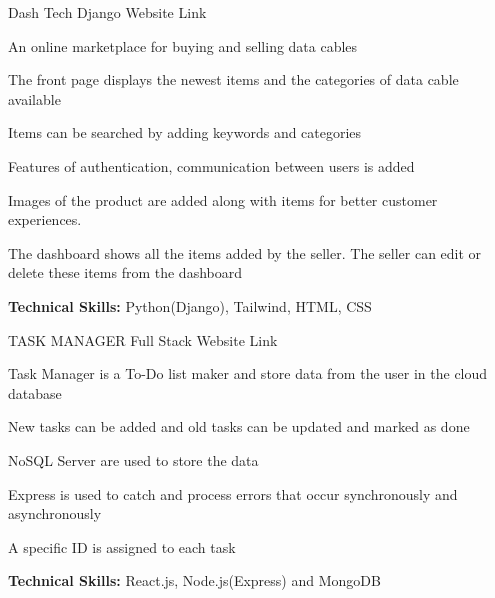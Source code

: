 \begin{cventries}
  \cventry
    {}%
    {Dash Tech} %
    {Django Website} %
    {Link} %
    {
      \begin{cvitems} %
        \item {An online marketplace for buying and selling data cables}
        \item {The front page displays the newest items and the categories of data cable available}
        \item {Items can be searched by adding keywords and categories}
        \item {Features of authentication, communication between users is added}
        \item{Images of the product are added along with items for better customer experiences.}
        \item {The dashboard shows all the items added by the seller. The seller can edit or delete these items from the dashboard}
        \item {\textbf{Technical Skills:} Python(Django), Tailwind, HTML, CSS}
      \end{cvitems}
    }
  \cventry
    {} %
    {TASK MANAGER} %
    {Full Stack Website} %
    {Link} %
    {
      \begin{cvitems} %
        \item {Task Manager is a To-Do list maker and store data from the user in the cloud database}
        \item {New tasks can be added and old tasks can be updated and marked as done}
        \item {NoSQL Server are used to store the data}
        \item {Express is used to catch and process errors that occur synchronously and asynchronously}
        \item {A specific ID is assigned to each task}
        \item {\textbf{Technical Skills:} React.js, Node.js(Express) and MongoDB}
      \end{cvitems}
    }

\end{cventries}
